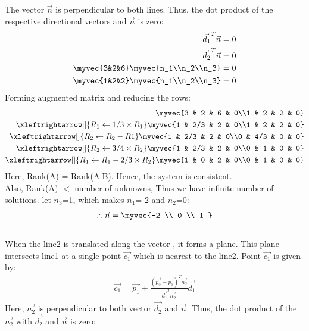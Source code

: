 \documentclass[journal,12pt,twocolumn]{IEEEtran}
\begin{document}
The vector $\vec{n}$ is perpendicular to both lines. Thus, the dot product of the respective directional vectors and  $\vec{n}$ is zero:
\begin{align}
    \vec{d_1}^T\vec{n} =  0\\
    \vec{d_2}^T\vec{n} =  0\\
    \myvec{3&2&6}\myvec{n_1\\n_2\\n_3}=0\\
    \myvec{1&2&2}\myvec{n_1\\n_2\\n_3}=0
\end{align}
Forming augmented matrix and reducing the rows:
\begin{align}
\myvec{3 & 2 & 6 & 0\\1 & 2 & 2 & 0}\\
\xleftrightarrow[]{R_1\leftarrow 1/3\times R_1}
\myvec{1 & 2/3 & 2 & 0\\1 & 2 & 2 & 0}\\
\xleftrightarrow[]{R_2\leftarrow R_2-R1}
\myvec{1 & 2/3 & 2 & 0\\0 & 4/3 & 0 & 0}\\
\xleftrightarrow[]{R_2\leftarrow 3/4 \times R_2}
\myvec{1 & 2/3 & 2 & 0\\0 & 1 & 0 & 0}\\
\xleftrightarrow[]{R_1\leftarrow R_1-2/3\times R_2}
\myvec{1 & 0 & 2 & 0\\0 & 1 & 0 & 0}
\end{align} 
Here, Rank(A) = Rank(A$\mid$B). Hence, the system is consistent. 
\\
Also, Rank(A) $<$ number of unknowns, Thus we have infinite number of solutions. let $n_3$=1, which makes $n_1$=-2 and $n_2$=0:
\begin{align}
    \therefore \vec{n}=\myvec{-2 \\ 0 \\ 1 }
\end{align}
\\
When the line2 is translated along the vector , it forms a plane. This plane intersects line1 at a single point $\vec{c_1}$ which is nearest to the line2. Point $\vec{c_1}$ is given by:
\\
\begin{align}
\vec{c_1}=\vec{p_1}+\frac{(\vec{p_2}-\vec{p_1})^T \vec{n_2}}{\vec{d_1}^T \vec{n_2}}\vec{d_1} 
\end{align}
Here, $\Vec{n_2}$ is perpendicular to both vector $\Vec{d_2}$ and $\Vec{n}$. Thus, the dot product of the $\Vec{n_2}$ with $\Vec{d_2}$ and $\Vec{n}$ is zero:
\end{document}
